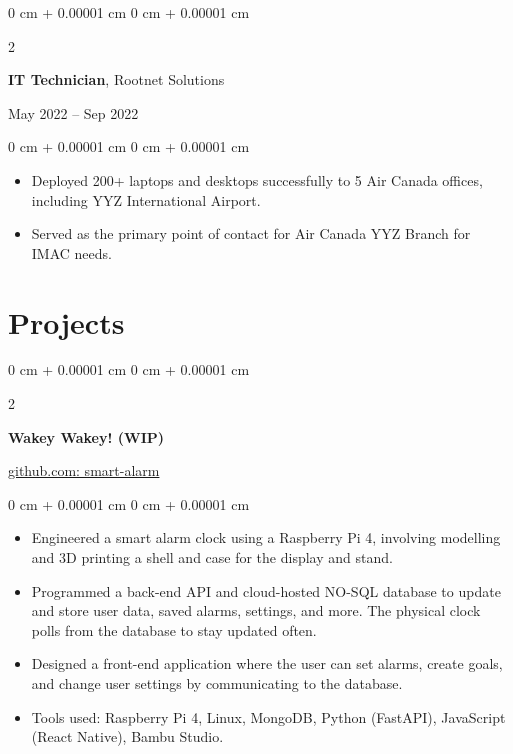 \documentclass[10pt, letterpaper]{article}
\newenvironment{highlights}{
    \begin{itemize}[
        topsep=0.10 cm,
        parsep=0.10 cm,
        partopsep=0pt,
        itemsep=0pt,
        leftmargin=0 cm + 10pt
    ]
}{
    \end{itemize}
} %
\newenvironment{onecolentry}{
    \begin{adjustwidth}{
        0 cm + 0.00001 cm
    }{
        0 cm + 0.00001 cm
    }
}{
    \end{adjustwidth}
} %
\newenvironment{twocolentry}[2][]{
    \onecolentry
    \def\secondColumn{#2}
    \setcolumnwidth{\fill, 4.5 cm}
    \begin{paracol}{2}
}{
    \switchcolumn \raggedleft \secondColumn
    \end{paracol}
    \endonecolentry
} %
\begin{document}
    \vspace{0.2 cm}
    \begin{twocolentry}{May 2022 – Sep 2022}
        \textbf{IT Technician}, Rootnet Solutions
    \end{twocolentry}
    \vspace{0.10 cm}
    \begin{onecolentry}
        \begin{highlights}
            \item Deployed 200+ laptops and desktops successfully to 5 Air Canada offices, including YYZ International Airport.
            \item Served as the primary point of contact for Air Canada YYZ Branch for IMAC needs.
        \end{highlights}
    \end{onecolentry}

    
    \section{Projects}
        \begin{twocolentry}
            {\href{https://github.com/ayushtvora/smart-alarm-clock}{github.com: smart-alarm}}
            \textbf{Wakey Wakey! (WIP)}
        \end{twocolentry}
        \vspace{0.1 cm}
        \begin{onecolentry}
            \begin{highlights}
                \item Engineered a smart alarm clock using a Raspberry Pi 4, involving modelling and 3D printing a shell and case for the display and stand.   
                \item Programmed a back-end API and cloud-hosted NO-SQL database to update and store user data, saved alarms, settings, and more. The physical clock polls from the database to stay updated often. 
                \item Designed a front-end application where the user can set alarms, create goals, and change user settings by communicating to the database.
                \item Tools used: Raspberry Pi 4, Linux, MongoDB, Python (FastAPI), JavaScript (React Native), Bambu Studio.
            \end{highlights}
        \end{onecolentry}
    
\end{document}
